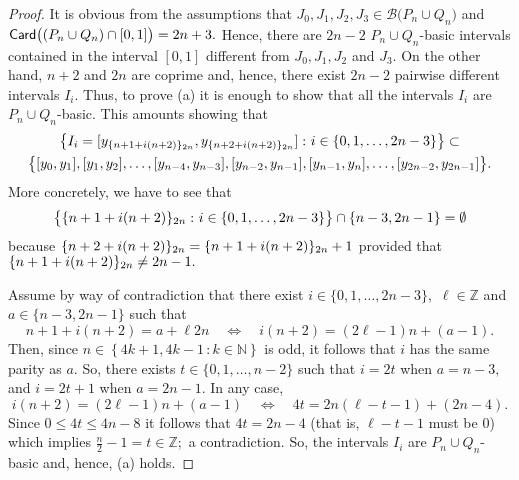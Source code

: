 \documentclass[a4paper, 11pt]{amsart}
\numberwithin{equation}{section}
\theoremstyle{customnumberedtheorem}
\theoremstyle{definitionwithbfnote}
\newcommand{\N}{\ensuremath{\mathbb{N}}}
\newcommand{\Z}{\ensuremath{\mathbb{Z}}}
\DeclareMathOperator{\Card}{\textsf{\upshape Card}}
\newcommand{\set}[2]{\ensuremath{\left\{#1 \,\colon #2\right\}}}
\def\calB{\mathcal{B}}
\newcommand{\bigSBI}[1]{\ensuremath{\calB\bigl(#1\bigr)}}
\newcommand{\modulo}[2]{\{#1\}\sb{#2}}
\begin{document}
\begin{proof}
It is obvious from the assumptions that
$J_0,J_1,J_2,J_3 \in \bigSBI{P_n \cup Q_n}$
and $\Card\bigl((P_n \cup Q_n) \cap [0,1]\bigr) = 2n + 3.$
Hence, there are $2n-2$ $P_n \cup Q_n$-basic intervals contained
in the interval $[0,1]$ different from $J_0,J_1,J_2$ and $J_3.$
On the other hand, $n+2$ and $2n$ are coprime and, hence,
there exist $2n-2$ pairwise different intervals $I_i.$
Thus, to prove (a) it is enough to show
that all the intervals $I_i$ are $P_n \cup Q_n$-basic.
This amounts showing that
\begin{multline*}
 \set{I_i = [y_{\modulo{n+1+i(n+2)}{2n}}, y_{\modulo{n+2+i(n+2)}{2n}}]}{i \in \{0,1,\dots,2n-3\}} \subset \\
    \bigl\{ [y_0,y_1], [y_1,y_2], \dots,
            [y_{n-4},y_{n-3}], [y_{n-2}, y_{n-1}], [y_{n-1},y_{n}],\dots,
            [y_{2n-2},y_{2n-1}]\bigr\}.
\end{multline*}
More concretely, we have to see that
\[
\bigl\{\modulo{n+1+i(n+2)}{2n} \,\colon i \in \{0,1,\dots,2n-3\}\bigr\} \cap \{n-3, 2n-1\} = \emptyset
\]
because $\modulo{n+2+i(n+2)}{2n} = \modulo{n+1+i(n+2)}{2n} + 1$
provided that $\modulo{n+1+i(n+2)}{2n} \ne 2n-1.$

Assume by way of contradiction that there exist
$i \in \{0,1,\dots,2n-3\},$ $\ell \in \Z$
and  $a \in \{n-3, 2n-1\}$ such that
\[
  n+1+i(n+2)  = a + \ell 2n
  \quad\Longleftrightarrow\quad
   i(n+2)  = (2\ell - 1)n + (a-1).
\]
Then, since $n \in \set{4k+1, 4k-1}{k\in \N}$ is odd,
it follows that $i$ has the same parity as $a.$
So, there exists $t \in \{0,1,\dots, n-2\}$ such that
$i = 2t$ when $a = n-3,$ and $i = 2t+1$ when $a = 2n-1.$
In any case,
\[
   i(n+2)  = (2\ell - 1)n + (a-1)
   \quad\Longleftrightarrow\quad
   4t  = 2n(\ell - t - 1) + (2n-4).
\]
Since $0 \le 4t \le 4n-8$ it follows that
$4t  = 2n-4$ (that is, $\ell - t - 1$ must be 0)
which implies $\tfrac{n}{2}-1 = t \in \Z;$
a contradiction. So, the intervals $I_i$ are
$P_n \cup Q_n$-basic and, hence, (a) holds.


\end{proof}
\end{document}
